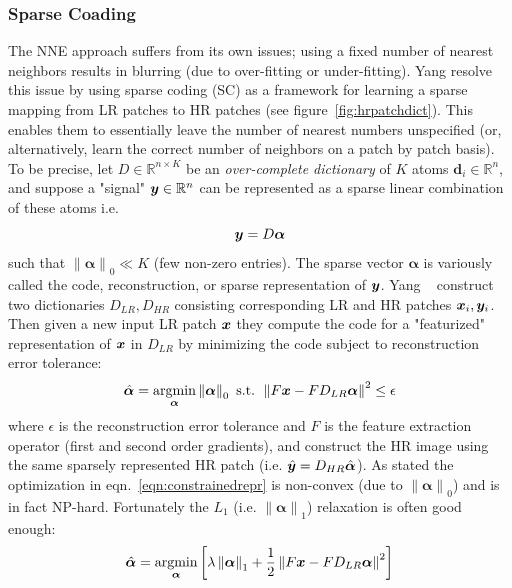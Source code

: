 \subsubsection{Sparse Coading}
The NNE approach suffers from its own issues; using a fixed number of nearest neighbors results in blurring (due to over-fitting or under-fitting).
%
Yang \etal\cite{yang2008} resolve this issue by using sparse coding (SC) as a framework for learning a sparse mapping from LR patches to HR patches (see figure~\ref{fig:hrpatchdict}).
%
This enables them to essentially leave the number of nearest numbers unspecified (or, alternatively, learn the correct number of neighbors on a patch by patch basis).
%
To be precise, let $D \in \mathbb{R}^{n \times K}$ be an \textit{over-complete dictionary} of $K$ atoms $\bm{d}_i \in \mathbb{R}^n$, and suppose a "signal" $\bm{y} \in \mathbb{R}^n$ can be represented as a sparse linear combination of these atoms i.e.
\begin{equation}
    \bm{y} = D\bm{\alpha}
\end{equation}
such that $\left\| \bm{\alpha} \right\|_0 \ll K$ (few non-zero entries).
%
The sparse vector $\bm{\alpha}$ is variously called the code, reconstruction, or sparse representation of $\bm{y}$.
%
Yang \etal~ construct two dictionaries $D_{LR}, D_{HR}$ consisting corresponding LR and HR patches $\bm{x}_i, \bm{y}_i$.
%
Then given a new input LR patch $\bm{x}$ they compute the code for a "featurized" representation of $\bm{x}$ in $D_{LR}$ by minimizing the code subject to reconstruction error tolerance:
\begin{equation}
    \hat{\bm{\alpha}} = \underset{\bm{\alpha}}{\text{argmin}} \left\| \bm{\alpha} \right\|_0 \text{ s.t. } \left\| F\bx - FD_{LR}\bm{\alpha} \right\|^2 \leq \epsilon
    \label{eqn:constrainedrepr}
\end{equation}
where $\epsilon$ is the reconstruction error tolerance and $F$ is the feature extraction operator (first and second order gradients), and construct the HR image using the same sparsely represented HR patch (i.e. $\hat{\bm{y}} = D_{HR} \hat{\bm{\alpha}}$).
%
As stated the optimization in eqn.~\eqref{eqn:constrainedrepr} is non-convex (due to $\left\| \bm{\alpha} \right\|_0$) and is in fact NP-hard\cite{tilman2015}.
%
Fortunately the $L_1$ (i.e. $\left\| \bm{\alpha} \right\|_1$) relaxation is often good enough\cite{Donoho9446}:
\begin{equation}
    \hat{\bm{\alpha}} = \underset{\bm{\alpha}}{\text{argmin}} \left[ \lambda\left\| \bm{\alpha} \right\|_1 + \frac{1}{2}\left\| F\bx - FD_{LR}\bm{\alpha} \right\|^2 \right]
    \label{eqn:lagrangerepr}
\end{equation}

